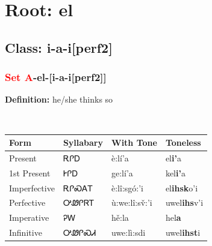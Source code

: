 \needspace{4in}
\section*{Root: el}
\nopagebreak
{}
\needspace{3in}
\subsection*{Class: i-a-i[perf2]}
\nopagebreak
\needspace{2in}
\subsubsection*{\textcolor{Red}{Set A}{-}\textbf{el}{-}[i-a-i[perf2]]}
\nopagebreak
\textbf{Definition: } he/she thinks so
\\[0.5em]
\begin{tabularx}{\textwidth}{l X X X}%
\toprule%
\textbf{Form}&\textbf{Syllabary}&\textbf{With Tone}&\textbf{Toneless}\\%
\midrule%
Present&ᎡᎵᎠ&è:lí’a&el\textbf{i'}a\\%
1st Present&ᎨᎵᎠ&ge:lí’a&kel\textbf{i'}a\\%
Imperfective&ᎡᎵᏍᎪᎢ&è:lî:sgó:’i&el\textbf{ihsk}o'i\\%
Perfective&ᎤᏪᎵᏒᎢ&ù:we:lî:sv̌:’i&uwel\textbf{ihs}v'i\\%
Imperative&ᎮᎳ&hě:la&hel\textbf{a}\\%
Infinitive&ᎤᏪᎵᏍᏗ&uwe:lì:sdi&uwel\textbf{ihst}i\\%
\bottomrule%
\end{tabularx}
\\[1em]
